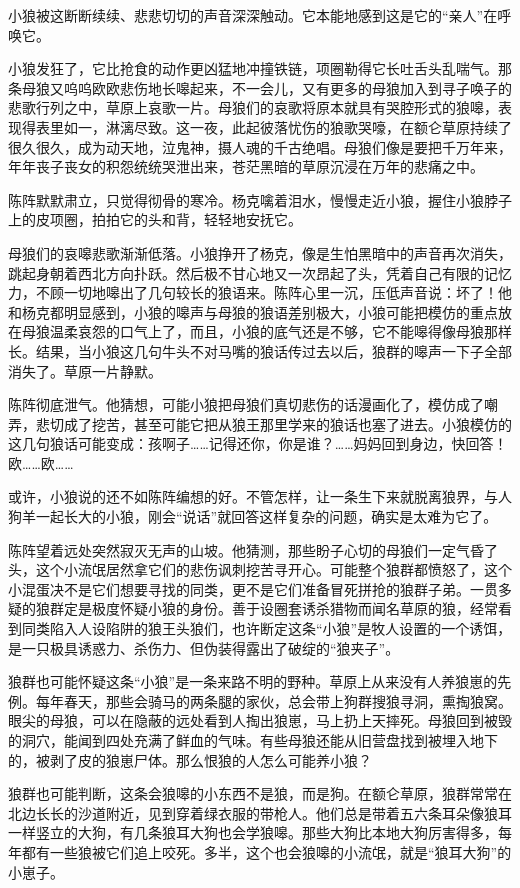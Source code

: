 \par 小狼被这断断续续、悲悲切切的声音深深触动。它本能地感到这是它的“亲人”在呼唤它。
\par 小狼发狂了，它比抢食的动作更凶猛地冲撞铁链，项圈勒得它长吐舌头乱喘气。那条母狼又呜呜欧欧悲伤地长嗥起来，不一会儿，又有更多的母狼加入到寻子唤子的悲歌行列之中，草原上哀歌一片。母狼们的哀歌将原本就具有哭腔形式的狼嗥，表现得表里如一，淋漓尽致。这一夜，此起彼落忧伤的狼歌哭嚎，在额仑草原持续了很久很久，成为动天地，泣鬼神，摄人魂的千古绝唱。母狼们像是要把千万年来，年年丧子丧女的积怨统统哭泄出来，苍茫黑暗的草原沉浸在万年的悲痛之中。
\par 陈阵默默肃立，只觉得彻骨的寒冷。杨克噙着泪水，慢慢走近小狼，握住小狼脖子上的皮项圈，拍拍它的头和背，轻轻地安抚它。
\par 母狼们的哀嗥悲歌渐渐低落。小狼挣开了杨克，像是生怕黑暗中的声音再次消失，跳起身朝着西北方向扑跃。然后极不甘心地又一次昂起了头，凭着自己有限的记忆力，不顾一切地嗥出了几句较长的狼语来。陈阵心里一沉，压低声音说：坏了！他和杨克都明显感到，小狼的嗥声与母狼的狼语差别极大，小狼可能把模仿的重点放在母狼温柔哀怨的口气上了，而且，小狼的底气还是不够，它不能嗥得像母狼那样长。结果，当小狼这几句牛头不对马嘴的狼话传过去以后，狼群的嗥声一下子全部消失了。草原一片静默。
\par 陈阵彻底泄气。他猜想，可能小狼把母狼们真切悲伤的话漫画化了，模仿成了嘲弄，悲切成了挖苦，甚至可能它把从狼王那里学来的狼话也塞了进去。小狼模仿的这几句狼话可能变成：孩啊子……记得还你，你是谁？……妈妈回到身边，快回答！欧……欧……
\par 或许，小狼说的还不如陈阵编想的好。不管怎样，让一条生下来就脱离狼界，与人狗羊一起长大的小狼，刚会“说话”就回答这样复杂的问题，确实是太难为它了。
\par 陈阵望着远处突然寂灭无声的山坡。他猜测，那些盼子心切的母狼们一定气昏了头，这个小流氓居然拿它们的悲伤讽刺挖苦寻开心。可能整个狼群都愤怒了，这个小混蛋决不是它们想要寻找的同类，更不是它们准备冒死拼抢的狼群子弟。一贯多疑的狼群定是极度怀疑小狼的身份。善于设圈套诱杀猎物而闻名草原的狼，经常看到同类陷入人设陷阱的狼王头狼们，也许断定这条“小狼”是牧人设置的一个诱饵，是一只极具诱惑力、杀伤力、但伪装得露出了破绽的“狼夹子”。
\par 狼群也可能怀疑这条“小狼”是一条来路不明的野种。草原上从来没有人养狼崽的先例。每年春天，那些会骑马的两条腿的家伙，总会带上狗群搜狼寻洞，熏掏狼窝。眼尖的母狼，可以在隐蔽的远处看到人掏出狼崽，马上扔上天摔死。母狼回到被毁的洞穴，能闻到四处充满了鲜血的气味。有些母狼还能从旧营盘找到被埋入地下的，被剥了皮的狼崽尸体。那么恨狼的人怎么可能养小狼？
\par 狼群也可能判断，这条会狼嗥的小东西不是狼，而是狗。在额仑草原，狼群常常在北边长长的沙道附近，见到穿着绿衣服的带枪人。他们总是带着五六条耳朵像狼耳一样竖立的大狗，有几条狼耳大狗也会学狼嗥。那些大狗比本地大狗厉害得多，每年都有一些狼被它们追上咬死。多半，这个也会狼嗥的小流氓，就是“狼耳大狗”的小崽子。
